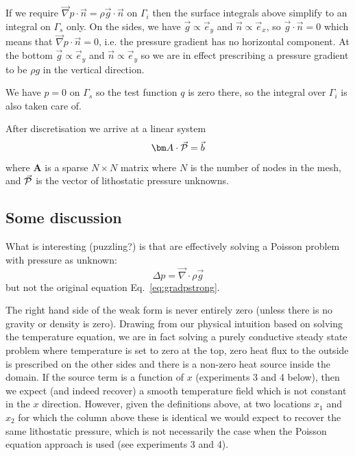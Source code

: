 If we require 
$\vec\nabla p \cdot \vec{n}= \rho \vec{g} \cdot \vec{n}$  on $\Gamma_i$
then the surface integrals above simplify to an integral on $\Gamma_s$ only.
On the sides, we have $\vec{g} \propto \vec{e}_y$ and $\vec{n} \propto \vec{e}_x$, 
so $ \vec{g} \cdot \vec{n}=0$ which means that $\vec\nabla p \cdot \vec{n}=0 $, i.e. 
the pressure gradient has no horizontal component.
At the bottom $\vec{g} \propto \vec{e}_y$ and $\vec{n} \propto \vec{e}_y$ so we are 
in effect prescribing a pressure gradient to be $\rho g$ in the vertical direction. 

We have $p=0$ on $\Gamma_s$ so the test function $q$ is zero there, 
so the integral over $\Gamma_i$ is also taken care of. 

After discretisation we arrive at a linear system 
\begin{equation}
{\bm A}\cdot \vec{\cal P} = \vec{b}
\label{eq:plith}
\end{equation}
where ${\bm A}$ is a sparse $N\times N$ matrix where $N$ is the number of nodes in the mesh, and 
$\vec{\cal P}$ is the vector of lithostatic pressure unknowns.

\subsection*{Some discussion}

What is interesting (puzzling?) is that \textcite{joma22} are effectively solving a Poisson problem with 
pressure as unknown:
\[
\Delta p = \vec\nabla \cdot \rho \vec{g} 
\]
but not the original equation Eq.~\eqref{eq:gradpstrong}.

The right hand side of the weak form is never entirely zero (unless there is no gravity or density
is zero). Drawing from our physical intuition based on solving the temperature equation, 
we are in fact solving a purely conductive steady state problem where temperature is set to 
zero at the top, zero heat flux to the outside is prescribed on the other sides and there is a non-zero heat source 
inside the domain. 
If the source term is a function of $x$ (experiments 3 and 4 below), then 
we expect (and indeed recover) a smooth temperature field which is not constant in the $x$ direction.
However, given the definitions above, at two locations $x_1$ and $x_2$ for which the column above these 
is identical we would expect to recover the same lithostatic pressure, which is not necessarily the case when the Poisson 
equation approach is used (see experiments 3 and 4).

